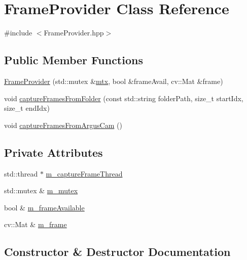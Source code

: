 \hypertarget{classFrameProvider}{}\section{Frame\+Provider Class Reference}
\label{classFrameProvider}


{\ttfamily \#include $<$Frame\+Provider.\+hpp$>$}

\subsection*{Public Member Functions}
\begin{DoxyCompactItemize}
\item 
\hyperlink{classFrameProvider_a03f142a7ea5878a32fec67f2b85f22fd}{Frame\+Provider} (std\+::mutex \&\hyperlink{campose__images__kitty__main2_8cpp_a29ac681ec3efa9e30e1ab1ab251b47f9}{mtx}, bool \&frame\+Avail, cv\+::\+Mat \&frame)
\item 
void \hyperlink{classFrameProvider_aa8334a484db470ee01b8718ab05ca997}{capture\+Frames\+From\+Folder} (const std\+::string folder\+Path, size\+\_\+t start\+Idx, size\+\_\+t end\+Idx)
\item 
void \hyperlink{classFrameProvider_a15097906b20d2d564b9bfea82c2f956c}{capture\+Frames\+From\+Argus\+Cam} ()
\end{DoxyCompactItemize}
\subsection*{Private Attributes}
\begin{DoxyCompactItemize}
\item 
std\+::thread $\ast$ \hyperlink{classFrameProvider_a08d38afae37b22f5c0117bdc950d83b4}{m\+\_\+capture\+Frame\+Thread}
\item 
std\+::mutex \& \hyperlink{classFrameProvider_a613fbc156614a7936ef4e05d8c9b0219}{m\+\_\+mutex}
\item 
bool \& \hyperlink{classFrameProvider_a46df01a978cd8d56cd4ffafb676d8a44}{m\+\_\+frame\+Available}
\item 
cv\+::\+Mat \& \hyperlink{classFrameProvider_afc074a4806d6406cbb395f98494a2172}{m\+\_\+frame}
\end{DoxyCompactItemize}


\subsection{Constructor \& Destructor Documentation}
\mbox{\label{classFrameProvider_a03f142a7ea5878a32fec67f2b85f22fd}} 
